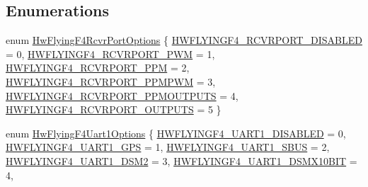 \subsection*{\-Enumerations}
\begin{DoxyCompactItemize}
\item 
enum \hyperlink{group___hw_flying_f4_gab64b79d6d4642bd4d7a93ffb79753658}{\-Hw\-Flying\-F4\-Rcvr\-Port\-Options} \{ \*
\hyperlink{group___hw_flying_f4_ggab64b79d6d4642bd4d7a93ffb79753658aa8051e9f122fda5d85e54274bff15a30}{\-H\-W\-F\-L\-Y\-I\-N\-G\-F4\-\_\-\-R\-C\-V\-R\-P\-O\-R\-T\-\_\-\-D\-I\-S\-A\-B\-L\-E\-D} = 0, 
\hyperlink{group___hw_flying_f4_ggab64b79d6d4642bd4d7a93ffb79753658ad077d005cf6aebe73d4dfd21b54913a8}{\-H\-W\-F\-L\-Y\-I\-N\-G\-F4\-\_\-\-R\-C\-V\-R\-P\-O\-R\-T\-\_\-\-P\-W\-M} = 1, 
\hyperlink{group___hw_flying_f4_ggab64b79d6d4642bd4d7a93ffb79753658ade8b7a46f09652daafb7eb2d26fcbb59}{\-H\-W\-F\-L\-Y\-I\-N\-G\-F4\-\_\-\-R\-C\-V\-R\-P\-O\-R\-T\-\_\-\-P\-P\-M} = 2, 
\hyperlink{group___hw_flying_f4_ggab64b79d6d4642bd4d7a93ffb79753658a0bf56b9f3b52c50942327be70b82b023}{\-H\-W\-F\-L\-Y\-I\-N\-G\-F4\-\_\-\-R\-C\-V\-R\-P\-O\-R\-T\-\_\-\-P\-P\-M\-P\-W\-M} = 3, 
\*
\hyperlink{group___hw_flying_f4_ggab64b79d6d4642bd4d7a93ffb79753658a84988f9e6a63eb2f38f077d4c87db0f5}{\-H\-W\-F\-L\-Y\-I\-N\-G\-F4\-\_\-\-R\-C\-V\-R\-P\-O\-R\-T\-\_\-\-P\-P\-M\-O\-U\-T\-P\-U\-T\-S} = 4, 
\hyperlink{group___hw_flying_f4_ggab64b79d6d4642bd4d7a93ffb79753658aea4dbf000c21e6db672e3e907c00891e}{\-H\-W\-F\-L\-Y\-I\-N\-G\-F4\-\_\-\-R\-C\-V\-R\-P\-O\-R\-T\-\_\-\-O\-U\-T\-P\-U\-T\-S} = 5
 \}
\item 
enum \hyperlink{group___hw_flying_f4_ga7a803e04e313024c8b7552e4155a7a96}{\-Hw\-Flying\-F4\-Uart1\-Options} \{ \*
\hyperlink{group___hw_flying_f4_gga7a803e04e313024c8b7552e4155a7a96aef0833ac121d85f4e50746b525dd5f4f}{\-H\-W\-F\-L\-Y\-I\-N\-G\-F4\-\_\-\-U\-A\-R\-T1\-\_\-\-D\-I\-S\-A\-B\-L\-E\-D} = 0, 
\hyperlink{group___hw_flying_f4_gga7a803e04e313024c8b7552e4155a7a96a83c04159b6f9e1777e6410bc01e6d459}{\-H\-W\-F\-L\-Y\-I\-N\-G\-F4\-\_\-\-U\-A\-R\-T1\-\_\-\-G\-P\-S} = 1, 
\hyperlink{group___hw_flying_f4_gga7a803e04e313024c8b7552e4155a7a96aea408b586449c1d22b6d53ed78317c8f}{\-H\-W\-F\-L\-Y\-I\-N\-G\-F4\-\_\-\-U\-A\-R\-T1\-\_\-\-S\-B\-U\-S} = 2, 
\hyperlink{group___hw_flying_f4_gga7a803e04e313024c8b7552e4155a7a96a0672c53381c9cbf1344d4e73f5564051}{\-H\-W\-F\-L\-Y\-I\-N\-G\-F4\-\_\-\-U\-A\-R\-T1\-\_\-\-D\-S\-M2} = 3, 
\*
\hyperlink{group___hw_flying_f4_gga7a803e04e313024c8b7552e4155a7a96a2ace11bfa64c3829eee58f0b7f8ef3e3}{\-H\-W\-F\-L\-Y\-I\-N\-G\-F4\-\_\-\-U\-A\-R\-T1\-\_\-\-D\-S\-M\-X10\-B\-I\-T} = 4, 

\end{DoxyCompactItemize}

